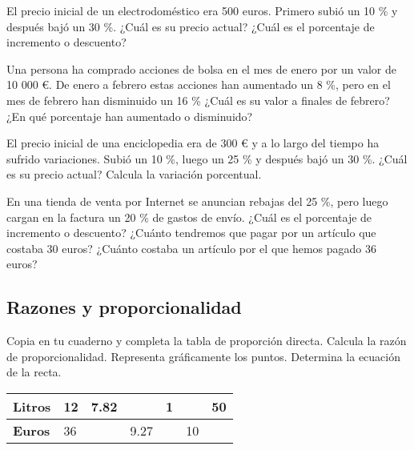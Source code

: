 \begin{ejer}
El precio inicial de un electrodoméstico era 500 euros. Primero subió un 10 \% y después bajó un 30 \%. ¿Cuál es su precio actual? ¿Cuál es el porcentaje de incremento o descuento?
\end{ejer}

\begin{ejer}
Una persona ha comprado acciones de bolsa en el mes de enero por un valor de 10 000 €. De enero a febrero estas acciones han aumentado un 8 \%, pero en el mes de febrero han disminuido un 16 \% ¿Cuál es su valor a finales de febrero? ¿En qué porcentaje han aumentado o disminuido?
\end{ejer}

\begin{ejer}
El precio inicial de una enciclopedia era de 300 € y a lo largo del tiempo ha sufrido variaciones. Subió un 10 \%, luego un 25 \% y después bajó un 30 \%. ¿Cuál es su precio actual? Calcula la variación porcentual.
\end{ejer}

\begin{ejer}
En una tienda de venta por Internet se anuncian rebajas del 25 \%, pero luego cargan en la factura un 20 \% de gastos de envío. ¿Cuál es el porcentaje de incremento o descuento? ¿Cuánto tendremos que pagar por un artículo que costaba 30 euros? ¿Cuánto costaba un artículo por el que hemos pagado 36 euros?
\end{ejer}

\subsection{Razones y proporcionalidad}

\begin{ejer}
Copia en tu cuaderno y completa la tabla de proporción directa. Calcula la razón de proporcionalidad. Representa gráficamente los puntos. Determina la ecuación de la recta.
\end{ejer}

\begin{table}[!h]
\begin{center}
\begin{tabularx}{\textwidth}{|X | X | X | X | X | X| X|} 
 \hline
 \textbf{Litros} & 12 & 7.82 &  & 1 & & 50 \\
 \hline
 \textbf{Euros} & 36 &  & 9.27 &  & 10 & \\
 \hline 
\end{tabularx}
\end{center}
\end{table}

